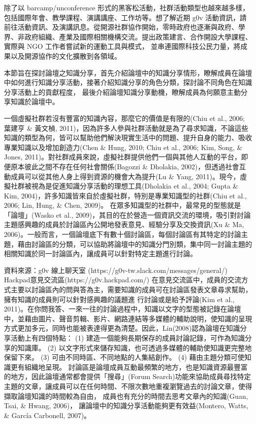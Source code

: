 除了以 barcamp/unconference 形式的黑客松活動，社群活動類型也越來越多樣，包括國際年會、教學課程、演講講座、工作坊等。想了解近期 g0v 活動資訊，請前往活動資訊、及演講訊息。從開源社群協作開始，零時政府也逐漸與政府、學界、非政府組織、產業及國際相關機構交流。提出政策建言、合作開設大學課程、實際與 NGO 工作者嘗試新的運動工具與模式，
並串連國際科技公民力量，將成果以及開源協作的文化擴散到各領域。

本節旨在探討論壇之知識分享，首先介紹論壇中的知識分享情形，瞭解成員在論壇中如何進行知識分享活動，接著介紹知識分享的角色分類，探討論不同角色在知識分享活動上的貢獻程度，
最後介紹論壇知識分享動機，瞭解成員為何願意主動分享知識於論壇中。 


一個虛擬社群若沒有豐富的知識內容，那麼它的價值是有限的(Chiu et al.,
2006; 葉建亨 \& 黃文楨, 2011)，因為許多人參與社群活動就是為了尋求知識，不論這些知識的類型為何，皆可以幫助他們解決現實生活中的問題、提升自身的能力、吸收專業知識以及增加創造力(Chen \& Hung, 2010; Chiu et al., 2006; Kim, Song, \& Jones, 2011)。對社群成員來說，虛擬社群提供他們一個與其他人互動的平台，即便原本彼此之間不存在任何社會關係(Bagozzi \& Dholakia, 2002)，但透過社會互動成員可以從其他人身上得到資源的機會大為提升(Lu \& Yang, 2011)。現今，虛擬社群被視為是促進知識分享活動的理想工具(Dholakia et al., 2004; Gupta \& Kim, 2004)，許多知識皆來自於虛擬社群，特別是專業知識型的社群(Chiu et al., 2006; Lin, Hung, \& Chen, 2009)。
 在眾多知識型的社群中，最常見的型態就是「論壇」(Wasko et al., 2009)，其目的在於營造一個資訊交流的環境，吸引對討論主題感興趣的成員於討論區內公開地發表意見、經驗分享及交換資訊(Xu \& Ma, 2006)。一般而言，一個論壇底下有數十個討論區，每個討論區有其特定的討論主題，藉由討論區的分類，可以協助將論壇中的知識分門別類，集中同一討論主題的相關知識於同一討論區內，讓成員可以針對特定主題進行討論。 


資料來源：g0v 線上聊天室 (https://g0v-tw.slack.com/messages/general/)
          Hackpad意見交流區(https://g0v.hackpad.com/)
 在意見交流區中，成員的交流方式主要以討論區內的問與答為主，需要知識的成員可在討論區發表文章尋求幫助，
 擁有知識的成員則可以針對感興趣的議題進
行討論或是給予評論(Kim et al., 2011)。在你問我答、一來一往的討論過程中，知識以文字的型態被記錄在論壇中，並藉由圖片、聲音剪輯、影片、網路連結等多媒體的輔助說明，使知識的呈現方式更加多元，同時也能被表達得更為清楚。因此，Lin(2008)認為論壇在知識分享活動上有四個特點：
(1) 建造一個能夠長期保存的成員討論記錄，可作為知識分享的知識庫。
(2) 以文字形式來儲存知識，也可透過多媒體的輔助使知識更完整地保留下來。
(3) 可由不同時區、不同地點的人集結創作。
(4) 藉由主題分類可使知識更有組織地呈現。 
 討論區是論壇成員互動最頻繁的地方，也是知識資源最豐富的地方，因此論壇通常都會提供「搜尋」(Forum Search)功能來協助成員尋找特定主題的文章，讓成員可以在任何時間、不限次數地重複瀏覽過去的討論文章，使得擷取論壇知識的時間較為自由，
 成員也有充分的時間去思考文章內的知識(Guan, Tsai, \& Hwang, 2006)，
 讓論壇中的知識分享活動能夠更有效益(Montero, Watts, \& García Carbonell, 2007)。 

